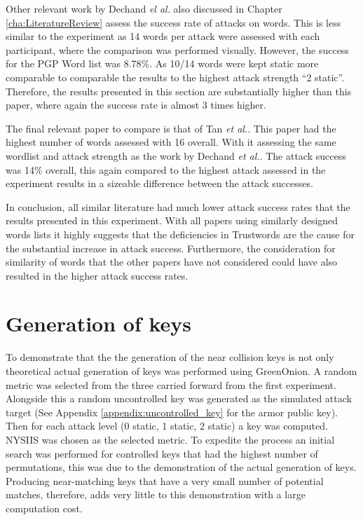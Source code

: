 Other relevant work by Dechand \textit{el al.}\cite{dechand2016empirical} also discussed in Chapter \ref{cha:LiteratureReview} assess the success rate of attacks on words. This is less similar to the experiment as 14 words per attack were assessed with each participant, where the comparison was performed visually. However, the success for the PGP Word list was 8.78\%. As 10/14 words were kept static more comparable to comparable the results to the highest attack strength ``2 static''. Therefore, the results presented in this section are substantially higher than this paper, where again the success rate is almost 3 times higher.

The final relevant paper to compare is that of Tan \textit{et al.}. This paper had the highest number of words assessed with 16 overall. With it assessing the same wordlist and attack strength as the work by Dechand \textit{et al.}. The attack success was 14\% overall, this again compared to the highest attack assessed in the experiment results in a sizeable difference between the attack successes.

In conclusion, all similar literature had much lower attack success rates that the results presented in this experiment. With all papers using similarly designed words lists it highly suggests that the deficiencies in Trustwords are the cause for the substantial increase in attack success. Furthermore, the consideration for similarity of words that the other papers have not considered could have also resulted in the higher attack success rates.

\section{Generation of keys}
To demonstrate that the the generation of the near collision keys is not only theoretical actual generation of keys was performed using GreenOnion. A random metric was selected from the three carried forward from the first experiment. Alongside this a random uncontrolled key was generated as the simulated attack target (See Appendix \ref{appendix:uncontrolled_key} for the armor public key). Then for each attack level (0 static, 1 static, 2 static) a key was computed. NYSIIS was chosen as the selected metric. To expedite the process an initial search was performed for controlled keys that had the highest number of permutations, this was due to the demonstration of the actual generation of keys. Producing near-matching keys that have a very small number of potential matches, therefore, adds very little to this demonstration with a large computation cost.

